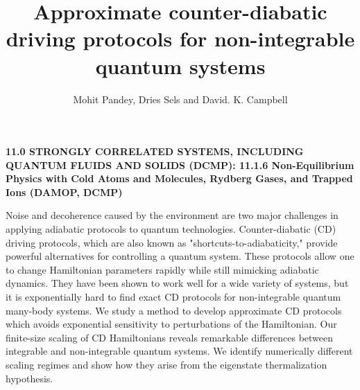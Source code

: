 \documentclass[11pt,a4paper]{article}
\author{Mohit Pandey, Dries Sels and David. K. Campbell}
\title{Approximate counter-diabatic driving protocols for non-integrable quantum systems  }
\begin{document}
\maketitle
\textbf{11.0 STRONGLY CORRELATED SYSTEMS, INCLUDING QUANTUM FLUIDS AND SOLIDS (DCMP): 11.1.6 Non-Equilibrium Physics with Cold Atoms and Molecules, Rydberg Gases, and Trapped Ions (DAMOP, DCMP)}

Noise and decoherence caused by the environment are two major challenges in applying adiabatic protocols to quantum technologies. Counter-diabatic (CD) driving protocols, which are also known as "shortcuts-to-adiabaticity," provide powerful alternatives for controlling a quantum system. These protocols allow one to change Hamiltonian parameters rapidly while still mimicking adiabatic dynamics. They have been shown to work well for a wide variety of systems, but it is exponentially hard to find exact CD protocols for non-integrable quantum many-body systems. We study a method to develop approximate CD protocols which avoids exponential sensitivity to perturbations of the Hamiltonian. Our finite-size scaling of CD Hamiltonians reveals remarkable differences between integrable and non-integrable quantum systems. We identify  numerically different scaling regimes and show how they arise from the eigenstate thermalization hypothesis.
\end{document}

